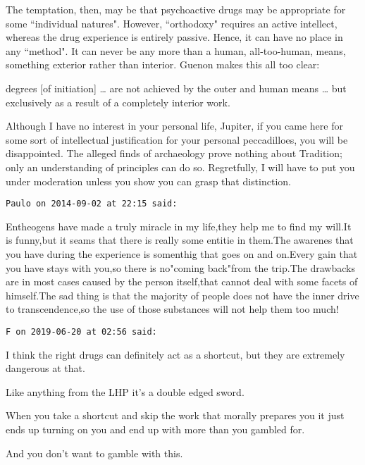 \begin{footnotesize}
\begin{sffamily}
\begin{quotex}
\end{quotex}
The temptation, then, may be that psychoactive drugs may be appropriate for some ``individual natures". However, ``orthodoxy" requires an active intellect, whereas the drug experience is entirely passive. Hence, it can have no place in any ``method". It can never be any more than a human, all-too-human, means, something exterior rather than interior. Guenon makes this all too clear:

\begin{quotex}
degrees [of initiation] … are not achieved by the outer and human means … but exclusively as a result of a completely interior work.

\end{quotex}
Although I have no interest in your personal life, Jupiter, if you came here for some sort of intellectual justification for your personal peccadilloes, you will be disappointed. The alleged finds of archaeology prove nothing about Tradition; only an understanding of principles can do so. Regretfully, I will have to put you under moderation unless you show you can grasp that distinction.


\hfill

\texttt{Paulo on 2014-09-02 at 22:15 said: }

Entheogens have made a truly miracle in my life,they help me to find my will.It is funny,but it seams that there is really some entitie in them.The awarenes that you have during the experience is somenthig that goes on and on.Every gain that you have stays with you,so there is no"coming back"from the trip.The drawbacks are in most cases caused by the person itself,that cannot deal with some facets of himself.The sad thing is that the majority of people does not have the inner drive to transcendence,so the use of those substances will not help them too much!


\hfill

\texttt{F on 2019-06-20 at 02:56 said: }

I think the right drugs can definitely act as a shortcut, but they are extremely dangerous at that.

Like anything from the LHP it's a double edged sword.

When you take a shortcut and skip the work that morally prepares you it just ends up turning on you and end up with more than you gambled for.

And you don't want to gamble with this.


\hfill


\end{sffamily}
\end{footnotesize}
